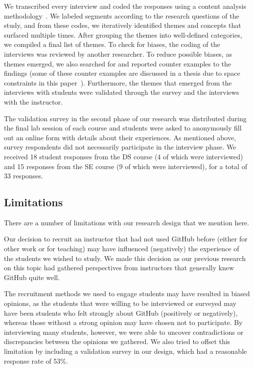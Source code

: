 We transcribed every interview and coded the responses using a content analysis methodology~\cite{charmaz2006constructing}.
We labeled segments according to the research questions of the study, and from these codes, we iteratively identified themes and concepts that surfaced multiple times. After grouping the themes into well-defined categories, we compiled a final list of themes. To check for biases, the coding of the interviews was reviewed by another researcher. To reduce possible biases, as themes emerged, we also searched for and reported counter examples to the findings (some of these counter examples are discussed in a thesis due to space constraints in this paper~\cite{feliciano2015towards}). Furthermore, the themes that emerged from the interviews with students were validated through the survey and the interviews with the instructor.

The validation survey in the second phase of our research was distributed during the final lab session of each course and students were asked to anonymously fill out an online form with details about their experiences. As mentioned above, survey respondents did not necessarily participate in the interview phase. We received 18 student responses from the DS course (4 of which were interviewed) and 15 responses from the SE course (9 of which were interviewed), for a total of 33 responses.

\subsection{Limitations}
There are a number of limitations with our research design that we mention here.

Our decision to recruit an instructor that had not used GitHub before (either for other work or for teaching) may have influenced (negatively) the experience of the students we wished to study. We made this decision as our previous research on this topic had gathered perspectives from instructors that generally knew GitHub quite well.

The recruitment methods we used to engage students may have resulted in biased opinions, as the students that were willing to be interviewed or surveyed may have been students who felt strongly about GitHub (positively or negatively), whereas those without a strong opinion may have chosen not to participate. By interviewing many students, however, we were able to uncover contradictions or discrepancies between the opinions we gathered. We also tried to offset this limitation by including a validation survey in our design, which had a reasonable response rate of 53\%.

